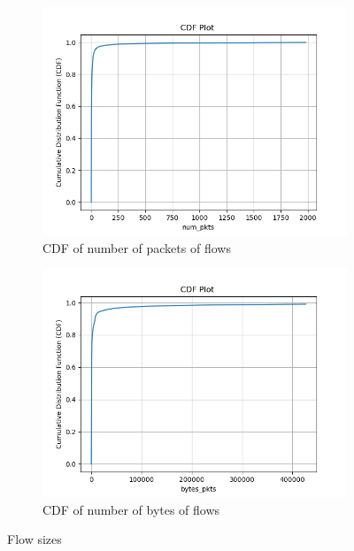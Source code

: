 \begin{figure}[t]
     \centering
     \begin{subfigure}[h]{0.49\textwidth}
         \centering
         \includegraphics[width=\textwidth]{Figures/num_pkts_cdf.png}
         \caption[CDF of number of packets of flows]{CDF of number of packets of flows}
         \label{fig:pkts1}
     \end{subfigure}
     \begin{subfigure}[h]{0.49\textwidth}
         \centering
         \includegraphics[width=\textwidth]{Figures/byte_pkts_cdf.png}
         \caption[CDF of number of bytes of flows]{CDF of number of bytes of flows}
         \label{fig:pkts2}
     \end{subfigure}
     \caption[Flow sizes]{Flow sizes}
     \label{fig:pktcdf}
     \bigskip
\end{figure}

